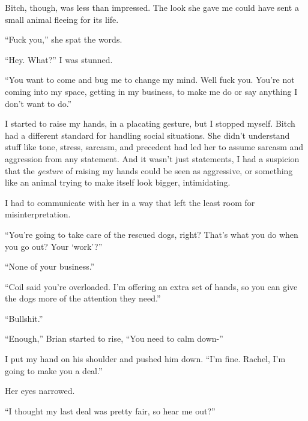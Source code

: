 Bitch, though, was less than impressed.  The look she gave me could have sent a small animal fleeing for its life.



``Fuck you,'' she spat the words.



``Hey.  What?'' I was stunned.



``You want to come and bug me to change my mind.  Well fuck you.  You're not coming into my space, getting in my business, to make me do or say anything I don't want to do.''



I started to raise my hands, in a placating gesture, but I stopped myself.  Bitch had a different standard for handling social situations.  She didn't understand stuff like tone, stress, sarcasm, and precedent had led her to assume sarcasm and aggression from any statement.  And it wasn't just statements, I had a suspicion that the \emph{gesture} of raising my hands could be seen as aggressive, or something like an animal trying to make itself look bigger, intimidating.



I had to communicate with her in a way that left the least room for misinterpretation.



``You're going to take care of the rescued dogs, right?  That's what you do when you go out?  Your `work'?''



``None of your business.''



``Coil said you're overloaded.  I'm offering an extra set of hands, so you can give the dogs more of the attention they need.''



``Bullshit.''



``Enough,'' Brian started to rise, ``You need to calm down-''



I put my hand on his shoulder and pushed him down.  ``I'm fine.  Rachel, I'm going to make you a deal.''



Her eyes narrowed.



``I thought my last deal was pretty fair, so hear me out?''




